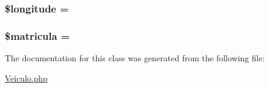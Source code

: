 \subsubsection[{\$longitude}]{\setlength{\rightskip}{0pt plus 5cm}\$longitude = \textquotesingle{}\textquotesingle{}}\label{class_veiculo_aabb5b5c018fed3789fce382e336cfa47}
\hypertarget{class_veiculo_a981952d6d80353d7e767797f7eeac2f6}{}
\subsubsection[{\$matricula}]{\setlength{\rightskip}{0pt plus 5cm}\$matricula = \textquotesingle{}\textquotesingle{}}\label{class_veiculo_a981952d6d80353d7e767797f7eeac2f6}


The documentation for this class was generated from the following file\+:\begin{DoxyCompactItemize}
\item 
\hyperlink{_veiculo_8php}{Veiculo.\+php}\end{DoxyCompactItemize}
